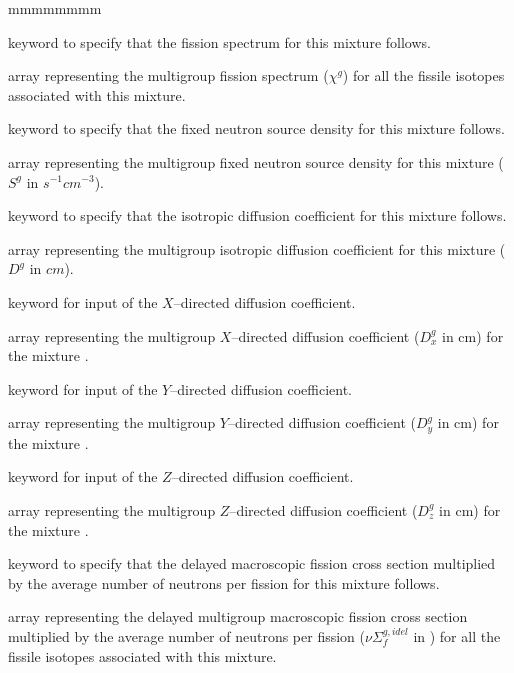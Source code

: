 \begin{ListeDeDescription}{mmmmmmmm}
\item[\moc{CHI}] keyword to specify that the fission spectrum for this mixture
follows.

\item[\dusa{xschi}] array representing the multigroup fission spectrum
($\chi^{g}$) for all the fissile isotopes associated with this mixture.

\item[\moc{FIXE}] keyword to specify that the fixed neutron source density for
this mixture follows.

\item[\dusa{xsfixe}] array representing the multigroup fixed neutron source
density for this mixture ($S^{g}$ in $s^{-1}cm^{-3}$). 

\item[\moc{DIFF}] keyword to specify that the isotropic diffusion coefficient for
this mixture follows.

\item[\dusa{diff}] array representing the multigroup isotropic diffusion coefficient for
this mixture ($D^{g}$ in $cm$). 

\item[\moc{DIFFX}] keyword for input of the $X$--directed diffusion coefficient. 

\item[\dusa{xdiffx}] array representing the multigroup $X$--directed diffusion coefficient ($D^g_x$ in cm) for the mixture 
. 

\item[\moc{DIFFY}] keyword for input of the $Y$--directed diffusion coefficient. 

\item[\dusa{xdiffy}] array representing the multigroup $Y$--directed diffusion coefficient ($D^g_y$ in cm) for the mixture 
. 

\item[\moc{DIFFZ}] keyword for input of the $Z$--directed diffusion coefficient.

\item[\dusa{xdiffz}] array representing the multigroup $Z$--directed diffusion coefficient ($D^g_z$ in cm) for the mixture 
. 

\item[\moc{NUSIGD}] keyword to specify that the delayed macroscopic fission cross
section multiplied by the average number of neutrons per fission for this
mixture follows.

\item[\dusa{xssigd}] array representing the delayed multigroup macroscopic fission
cross section multiplied by the average number
of neutrons per fission ($\nu\Sigma_{f}^{g,idel}$ in \xsunit) for all the fissile
isotopes associated with this mixture. 


\end{ListeDeDescription}
